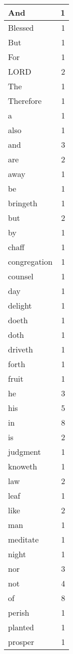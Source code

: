 \begin{center}
\begin{longtable}{l|r}
\hline \hline
\endlastfoot
And & 1 \\ \hline
Blessed & 1 \\ \hline
But & 1 \\ \hline
For & 1 \\ \hline
LORD & 2 \\ \hline
The & 1 \\ \hline
Therefore & 1 \\ \hline
a & 1 \\ \hline
also & 1 \\ \hline
and & 3 \\ \hline
are & 2 \\ \hline
away & 1 \\ \hline
be & 1 \\ \hline
bringeth & 1 \\ \hline
but & 2 \\ \hline
by & 1 \\ \hline
chaff & 1 \\ \hline
congregation & 1 \\ \hline
counsel & 1 \\ \hline
day & 1 \\ \hline
delight & 1 \\ \hline
doeth & 1 \\ \hline
doth & 1 \\ \hline
driveth & 1 \\ \hline
forth & 1 \\ \hline
fruit & 1 \\ \hline
he & 3 \\ \hline
his & 5 \\ \hline
in & 8 \\ \hline
is & 2 \\ \hline
judgment & 1 \\ \hline
knoweth & 1 \\ \hline
law & 2 \\ \hline
leaf & 1 \\ \hline
like & 2 \\ \hline
man & 1 \\ \hline
meditate & 1 \\ \hline
night & 1 \\ \hline
nor & 3 \\ \hline
not & 4 \\ \hline
of & 8 \\ \hline
perish & 1 \\ \hline
planted & 1 \\ \hline
prosper & 1 \\ \hline

\end{longtable}
\end{center}
